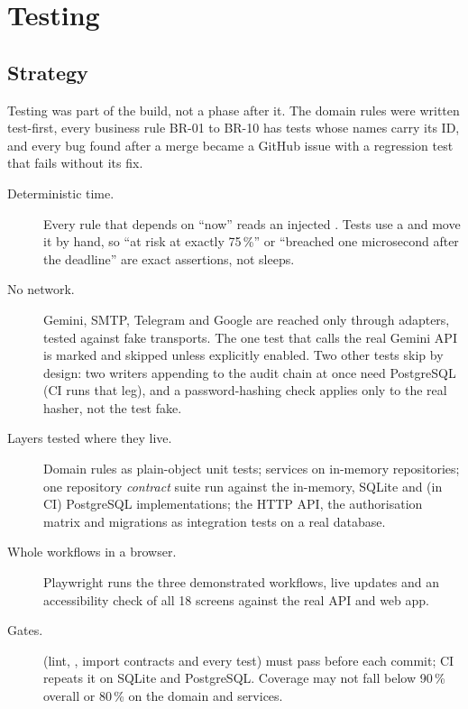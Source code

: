 \chapter{Testing}\label{ch:testing}

\section{Strategy}
Testing was part of the build, not a phase after it. The domain rules were written test-first,
every business rule BR-01 to BR-10 has tests whose names carry its ID, and every bug found after
a merge became a GitHub issue with a regression test that fails without its fix.

\begin{description}
  \item[Deterministic time.] Every rule that depends on ``now'' reads an injected .
    Tests use a  and move it by hand, so ``at risk at exactly 75\,\%'' or
    ``breached one microsecond after the deadline'' are exact assertions, not sleeps.
  \item[No network.] Gemini, SMTP, Telegram and Google are reached only through adapters,
    tested against fake transports. The one test that calls the real Gemini API is marked
     and skipped unless explicitly enabled. Two other tests skip by
    design: two writers appending to the audit chain at once need PostgreSQL (CI runs that
    leg), and a password-hashing check applies only to the real hasher, not the test fake.
  \item[Layers tested where they live.] Domain rules as plain-object unit tests; services on
    in-memory repositories; one repository \emph{contract} suite run against the in-memory,
    SQLite and (in CI) PostgreSQL implementations; the HTTP API, the authorisation matrix and
    migrations as integration tests on a real database.
  \item[Whole workflows in a browser.] Playwright runs the three demonstrated workflows, live
    updates and an accessibility check of all 18 screens against the real API and web app.
  \item[Gates.]  (lint, , import contracts and every test)
    must pass before each commit; CI repeats it on SQLite and PostgreSQL. Coverage may not fall
    below 90\,\% overall or 80\,\% on the domain and services.
\end{description}

